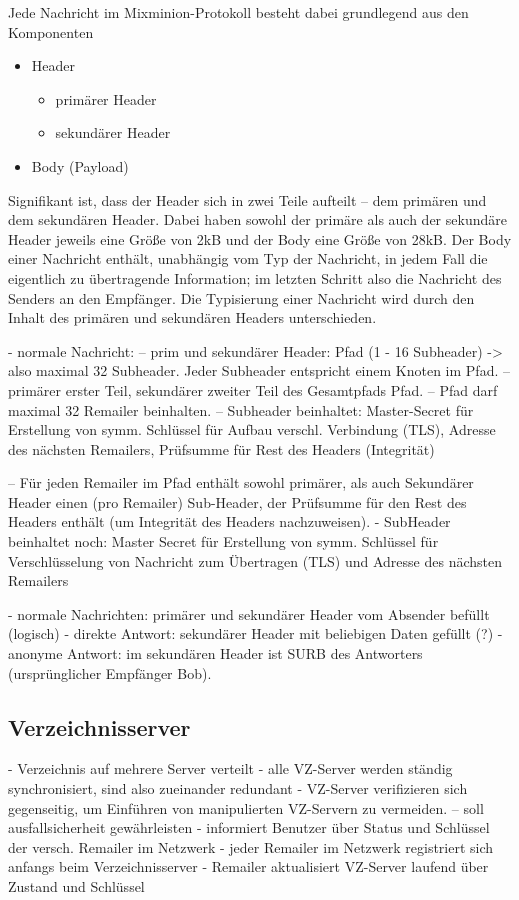 Jede Nachricht im Mixminion-Protokoll besteht dabei grundlegend aus den Komponenten 
\begin{itemize}
\item Header
	\begin{itemize}
	\item primärer Header
	\item sekundärer Header
	\end{itemize}
\item Body (Payload)
\end{itemize}

Signifikant ist, dass der Header sich in zwei Teile aufteilt -- dem primären und dem sekundären Header. Dabei haben sowohl der primäre als auch der sekundäre Header jeweils eine Größe von 2kB und der Body eine Größe von 28kB. Der Body einer Nachricht enthält, unabhängig vom Typ der Nachricht, in jedem Fall die eigentlich zu übertragende Information; im letzten Schritt also die Nachricht des Senders an den Empfänger. Die Typisierung einer Nachricht wird durch den Inhalt des primären und sekundären Headers unterschieden.

- normale Nachricht:
-- prim und sekundärer Header: Pfad (1 - 16 Subheader) -> also maximal 32 Subheader. Jeder Subheader entspricht einem Knoten im Pfad.
-- primärer erster Teil, sekundärer zweiter Teil des Gesamtpfads Pfad.
-- Pfad darf maximal 32 Remailer beinhalten.
-- Subheader beinhaltet: Master-Secret für Erstellung von symm. Schlüssel für Aufbau verschl. Verbindung (TLS), Adresse des nächsten Remailers, Prüfsumme für Rest des Headers (Integrität)

-- Für jeden Remailer im Pfad enthält sowohl primärer, als auch Sekundärer Header einen (pro Remailer) Sub-Header, der Prüfsumme für den Rest des Headers enthält (um Integrität des Headers nachzuweisen).
- SubHeader beinhaltet noch: Master Secret für Erstellung von symm. Schlüssel für Verschlüsselung von Nachricht zum Übertragen (TLS) und Adresse des nächsten Remailers

- normale Nachrichten: primärer und sekundärer Header vom Absender befüllt (logisch)
- direkte Antwort: sekundärer Header mit beliebigen Daten gefüllt (?)
- anonyme Antwort: im sekundären Header ist SURB des Antworters (ursprünglicher Empfänger Bob).

\subsection{Verzeichnisserver}
- Verzeichnis auf mehrere Server verteilt
- alle VZ-Server werden ständig synchronisiert, sind also zueinander redundant
- VZ-Server verifizieren sich gegenseitig, um Einführen von manipulierten VZ-Servern zu vermeiden.
-- soll ausfallsicherheit gewährleisten
- informiert Benutzer über Status und Schlüssel der versch. Remailer im Netzwerk
- jeder Remailer im Netzwerk registriert sich anfangs beim Verzeichnisserver
- Remailer aktualisiert VZ-Server laufend über Zustand und Schlüssel

